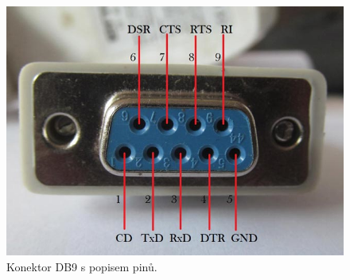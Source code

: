 \begin{figure}[!h]
    \begin{center}
        \includegraphics[scale=0.4]{obrazky/RS232.jpeg}
    \end{center}
    \label{rs232_obr}
    \caption{Konektor DB9 s popisem pinů. \cite{RS232}}
\end{figure}

%
%
%
%
